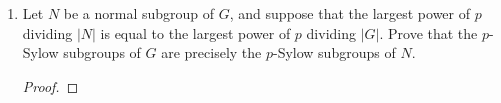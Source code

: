 \documentclass[../psets.tex]{subfiles}
\begin{document}
\begin{enumerate}
\begin{proof}
        Groups of order $p^2$ and groups of order $p$ are abelian, always?? Counterexample: $p=3$, $S_9$ has abelian $p$-Sylow
        \begin{equation*}
            \gen{(1,2,3,4,5,6,7,8,9)}
        \end{equation*}
    \end{proof}
    \item Let $N$ be a normal subgroup of $G$, and suppose that the largest power of $p$ dividing $|N|$ is equal to the largest power of $p$ dividing $|G|$. Prove that the $p$-Sylow subgroups of $G$ are precisely the $p$-Sylow subgroups of $N$.
    \begin{proof}



\end{proof}
\end{enumerate}
\end{document}
